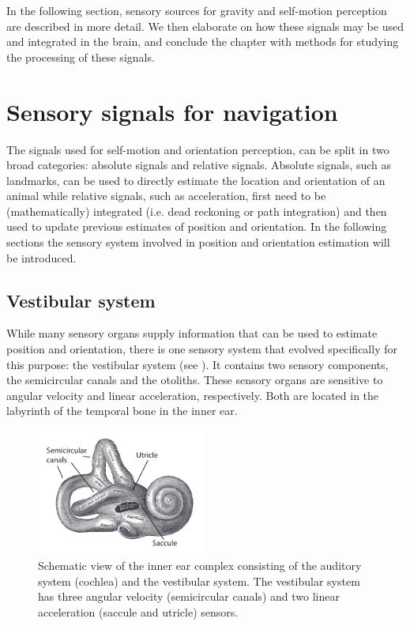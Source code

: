 In the following section, sensory sources for gravity and self-motion perception are described in more detail. We then elaborate on how these signals may be used and integrated in the brain, and conclude the chapter with methods for studying the processing of these signals. 
 


\section{Sensory signals for navigation}

The signals used for self-motion and orientation perception, can be split in two broad categories: absolute signals and relative signals. Absolute signals, such as landmarks, can be used to directly estimate the location and orientation of an animal while relative signals, such as acceleration, first need to be (mathematically) integrated (i.e. dead reckoning or path integration) and then used to update previous estimates of position and orientation. In the following sections the sensory system involved in position and orientation estimation will be introduced.

\subsection{Vestibular system}

While many sensory organs supply information that can be used to estimate position and orientation, there is one sensory system that evolved specifically for this purpose: the vestibular system (see ). It contains two sensory components, the semicircular canals and the otoliths. These sensory organs are sensitive to angular velocity and linear acceleration, respectively. Both are located in the labyrinth of the temporal bone in the inner ear.

\begin{figure}
    \includegraphics[width=0.5\textwidth]{src/intro/figures/vestibular.pdf}
    \caption{Schematic view of the inner ear complex consisting of the auditory system (cochlea) and the vestibular system. The vestibular system has three angular velocity (semicircular canals) and two linear acceleration (saccule and utricle) sensors.}
    \label{intro:fig6}
\end{figure}



